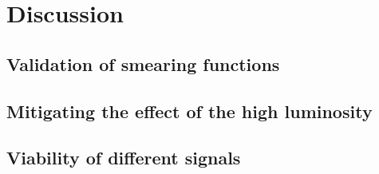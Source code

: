 \chapter{Discussion}\label{cha:dis}
\section{Validation of smearing functions}
\section{Mitigating the effect of the high luminosity}
\section{Viability of different signals}